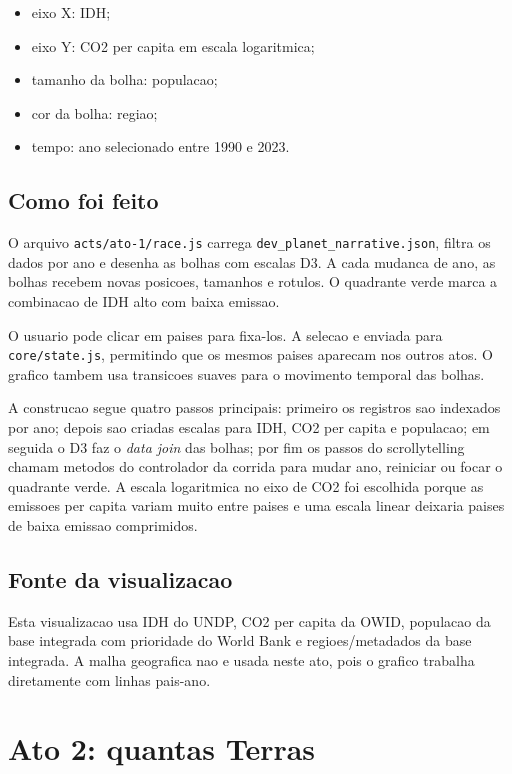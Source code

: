 \documentclass[12pt,a4paper]{article}
\begin{document}
\begin{itemize}
  \item eixo X: IDH;
  \item eixo Y: CO2 per capita em escala logaritmica;
  \item tamanho da bolha: populacao;
  \item cor da bolha: regiao;
  \item tempo: ano selecionado entre 1990 e 2023.
\end{itemize}

\subsection{Como foi feito}

O arquivo \texttt{acts/ato-1/race.js} carrega \texttt{dev\_planet\_narrative.json}, filtra os dados por ano e desenha as bolhas com escalas D3. A cada mudanca de ano, as bolhas recebem novas posicoes, tamanhos e rotulos. O quadrante verde marca a combinacao de IDH alto com baixa emissao.

O usuario pode clicar em paises para fixa-los. A selecao e enviada para \texttt{core/state.js}, permitindo que os mesmos paises aparecam nos outros atos. O grafico tambem usa transicoes suaves para o movimento temporal das bolhas.

A construcao segue quatro passos principais: primeiro os registros sao indexados por ano; depois sao criadas escalas para IDH, CO2 per capita e populacao; em seguida o D3 faz o \textit{data join} das bolhas; por fim os passos do scrollytelling chamam metodos do controlador da corrida para mudar ano, reiniciar ou focar o quadrante verde. A escala logaritmica no eixo de CO2 foi escolhida porque as emissoes per capita variam muito entre paises e uma escala linear deixaria paises de baixa emissao comprimidos.

\subsection{Fonte da visualizacao}

Esta visualizacao usa IDH do UNDP, CO2 per capita da OWID, populacao da base integrada com prioridade do World Bank e regioes/metadados da base integrada. A malha geografica nao e usada neste ato, pois o grafico trabalha diretamente com linhas pais-ano.

\section{Ato 2: quantas Terras}
\end{document}
